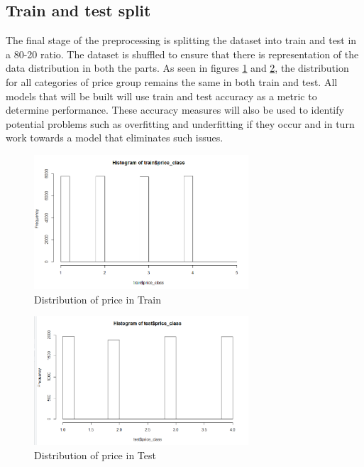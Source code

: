 \documentclass{sig-alternate}
\begin{document}
	\subsection{Train and test split}
	The final stage of the preprocessing is splitting the dataset into train and test in a 80-20 ratio. The dataset is shuffled to ensure that there is representation of the data distribution in both the parts. As seen in figures \ref{trainhist} and \ref{testhist}, the distribution for all categories of price group remains the same in both train and test. All models that will be built will use train and test accuracy as a metric to determine performance. These accuracy measures will also be used to identify potential problems such as overfitting and underfitting if they occur and in turn work towards a model that eliminates such issues.  
	\begin{figure}[ht]
		\includegraphics[width=8cm]{trainhist.png}
		\caption{Distribution of price in Train}
		\label{trainhist}
		\centering
	\end{figure}
\begin{figure}[ht]
	\includegraphics[width=8cm]{testhist.png}
	\caption{Distribution of price in Test}
	\label{testhist}
	\centering
\end{figure}
\end{document}
